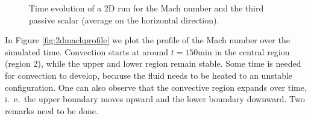 \begin{figure}[t!]
      \centering
     \centering
	\hfill
	\caption{Time evolution of a 2D run for the Mach number and the third passive scalar (average on the horizontal direction).}
	\label{fig:2dsinglefirst}
\end{figure}
In Figure \ref{fig:2dmachprofile} we plot the profile of the Mach number over the simulated time. Convection starts at around $t=150 \mathrm{min}$ in the central region (region 2), while the upper and lower region remain stable. Some time is needed for convection to develop, because the fluid needs to be heated to an unstable configuration. One can also observe that the convective region expands over time, i.\ e.\ the upper boundary moves upward and the lower boundary downward. Two remarks need to be done. 

